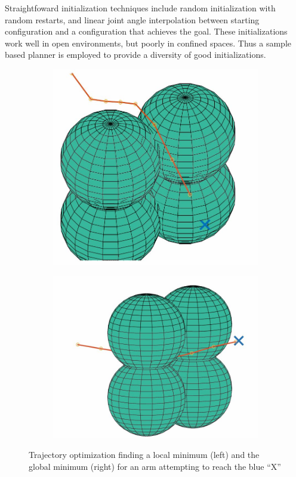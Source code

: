 \documentclass[../thesis.tex]{subfiles}
\begin{document}
Straightfoward initialization techniques include random initialization with random restarts, and linear joint angle interpolation between starting configuration and a configuration that achieves the goal.
These initializations work well in open environments, but poorly in confined spaces.
Thus a sample based planner is employed to provide a diversity of good initializations.

\begin{figure}
  \centering
  \begin{subfigure}[b]{0.4\linewidth}
    \includegraphics[width=\linewidth]{./Planning/Local.jpg}    
  \end{subfigure}
  \begin{subfigure}[b]{0.4\linewidth}
    \includegraphics[width=\linewidth]{./Planning/global.jpg}    
  \end{subfigure}
  \caption{Trajectory optimization finding a local minimum (left) and the global minimum (right) for an arm attempting to reach the blue ``X''}
  \label{fig:local_min}
\end{figure}
\end{document}
